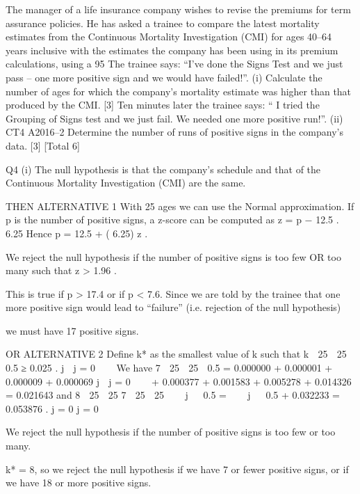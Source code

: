 \documentclass[a4paper,12pt]{article}
\begin{document}
The manager of a life insurance company wishes to revise the premiums for term
assurance policies. He has asked a trainee to compare the latest mortality estimates
from the Continuous Mortality Investigation (CMI) for ages 40–64 years inclusive
with the estimates the company has been using in its premium calculations, using a
95%
The trainee says: “I've done the Signs Test and we just pass – one more positive sign
and we would have failed!”.
(i)
Calculate the number of ages for which the company's mortality estimate was
higher than that produced by the CMI.
[3]
Ten minutes later the trainee says: “ I tried the Grouping of Signs test and we just fail.
We needed one more positive run!”.
(ii)
CT4 A2016–2
Determine the number of runs of positive signs in the company’s data.
[3]
[Total 6]

\newpage

Q4
(i)
The null hypothesis is that the company’s schedule and that of the Continuous
Mortality Investigation (CMI) are the same.

THEN ALTERNATIVE 1
With 25 ages we can use the Normal approximation.
If p is the number of positive signs, a z-score can be computed as
z =
p − 12.5
.
6.25
Hence
p = 12.5 + ( 6.25) z .

We reject the null hypothesis if the number of positive signs is too few OR too
many such that z > 1.96 .

This is true if p > 17.4 or if p < 7.6.
Since we are told by the trainee that one more positive sign would lead to
“failure” (i.e. rejection of the null hypothesis)

we must have 17 positive signs.

OR ALTERNATIVE 2
Define k* as the smallest value of k such that
k
 25  25
 0.5 ≥ 0.025 .
j 
j = 0
  
We have
7
 25  25
 0.5 = 0.000000 + 0.000001 + 0.000009 + 0.000069
j

j = 0
  
+ 0.000377 + 0.001583 + 0.005278 + 0.014326 = 0.021643
and
8
 25  25 7  25  25
   j   0.5 =    j   0.5 + 0.032233 = 0.053876 .
j = 0
j = 0

We reject the null hypothesis if the number of positive signs is too few or too
many.

k* = 8, so we reject the null hypothesis if we have 7 or fewer positive signs, or
if we have 18 or more positive signs.
\end{document}

